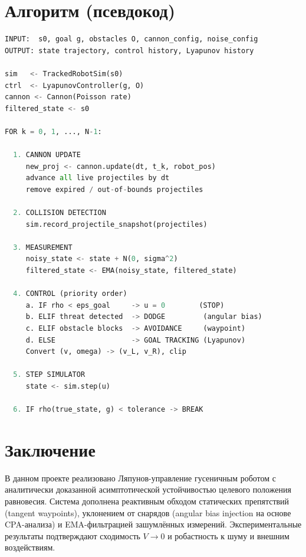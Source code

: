 \documentclass[12pt, a4paper]{article}
\theoremstyle{definition}
\theoremstyle{plain}
\begin{document}
\section{Алгоритм (псевдокод)}\label{sec:algorithm}

\begin{lstlisting}[language=Python, caption={Главный цикл симуляции}, label={lst:main}]
INPUT:  s0, goal g, obstacles O, cannon_config, noise_config
OUTPUT: state trajectory, control history, Lyapunov history

sim   <- TrackedRobotSim(s0)
ctrl  <- LyapunovController(g, O)
cannon <- Cannon(Poisson rate)
filtered_state <- s0

FOR k = 0, 1, ..., N-1:

  1. CANNON UPDATE
     new_proj <- cannon.update(dt, t_k, robot_pos)
     advance all live projectiles by dt
     remove expired / out-of-bounds projectiles

  2. COLLISION DETECTION
     sim.record_projectile_snapshot(projectiles)

  3. MEASUREMENT
     noisy_state <- state + N(0, sigma^2)
     filtered_state <- EMA(noisy_state, filtered_state)

  4. CONTROL (priority order)
     a. IF rho < eps_goal     -> u = 0        (STOP)
     b. ELIF threat detected  -> DODGE         (angular bias)
     c. ELIF obstacle blocks  -> AVOIDANCE     (waypoint)
     d. ELSE                  -> GOAL TRACKING (Lyapunov)
     Convert (v, omega) -> (v_L, v_R), clip

  5. STEP SIMULATOR
     state <- sim.step(u)

  6. IF rho(true_state, g) < tolerance -> BREAK
\end{lstlisting}

\section*{Заключение}

В данном проекте реализовано Ляпунов-управление гусеничным роботом с
аналитически доказанной асимптотической устойчивостью целевого положения
равновесия.  Система дополнена реактивным обходом статических препятствий
(tangent waypoints), уклонением от снарядов (angular bias injection на основе
CPA-анализа) и EMA-фильтрацией зашумлённых измерений.  Экспериментальные
результаты подтверждают сходимость $V \to 0$ и робастность к шуму и внешним
воздействиям.
\end{document}

